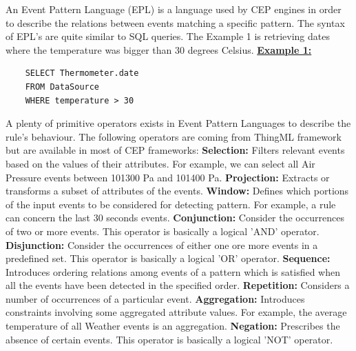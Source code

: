 \documentclass[11pt]{article}
\begin{document}
An Event Pattern Language (EPL) is a language used by CEP engines in order to describe the relations between events matching a specific pattern. The syntax of EPL's are quite similar to SQL queries. The Example 1 is retrieving dates where the temperature was bigger than 30 degrees Celsius.
\newline
\newline
\underline{\textbf{Example 1:}}
\begin{verbatim}
	SELECT Thermometer.date
	FROM DataSource
	WHERE temperature > 30
\end{verbatim}
A plenty of primitive operators exists in Event Pattern Languages to describe the rule's behaviour. The following operators are coming from ThingML framework but are available in most of CEP frameworks:
\newline
\newline
\textbf{Selection:} Filters relevant events based on the values of their attributes.\cite{6} For example, we can select all Air Pressure events between 101300 Pa and 101400 Pa.
\newline
\textbf{Projection:} Extracts or transforms a subset of attributes of the events.\cite{6}
\newline
\textbf{Window:} Defines which portions of the input events to be considered for detecting pattern.\cite{6} For example, a rule can concern the last 30 seconds events.
\newline
\textbf{Conjunction:} Consider the occurrences of two or more events.\cite{6} This operator is basically a logical 'AND' operator.
\newline
\textbf{Disjunction:} Consider the occurrences of either one ore more events in a predefined set.\cite{6} This operator is basically a logical 'OR' operator.
\newline
\textbf{Sequence:} Introduces ordering relations among events of a pattern which is satisfied when all the events have been detected in the specified order.\cite{6}
\newline
\textbf{Repetition:} Considers a number of occurrences of a particular event.\cite{6}
\newline
\textbf{Aggregation:} Introduces constraints involving some aggregated attribute values.\cite{6} For example, the average temperature of all Weather events is an aggregation.
\newline
\textbf{Negation:} Prescribes the absence of certain events.\cite{6} This operator is basically a logical 'NOT' operator.
\end{document}

